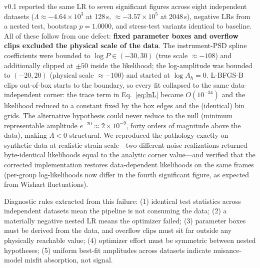 \documentclass[11pt]{article}
\newcommand{\Ah}{A_h}
\begin{document}
v0.1 reported the same LR to seven significant figures across eight independent datasets ($\Lambda \approx -4.64\times10^3$ at 128\,s, $\approx -3.57\times10^5$ at 2048\,s), negative LRs from a nested test, bootstrap $p = 1.0000$, and stress-test variants identical to baseline. All of these follow from one defect: \textbf{fixed parameter boxes and overflow clips excluded the physical scale of the data}. The instrument-PSD spline coefficients were bounded to $\log P \in (-30, 30)$ (true scale $\approx -108$) and additionally clipped at $\pm 50$ inside the likelihood; the log-amplitude was bounded to $(-20, 20)$ (physical scale $\approx -100$) and started at $\log \Ah = 0$. L-BFGS-B clips out-of-box starts to the boundary, so every fit collapsed to the same data-independent corner: the trace term in Eq.~\eqref{eq:lnL} became $O(10^{-34})$ and the likelihood reduced to a constant fixed by the box edges and the (identical) bin grids. The alternative hypothesis could never reduce to the null (minimum representable amplitude $e^{-20} \approx 2\times10^{-9}$, forty orders of magnitude above the data), making $\Lambda < 0$ structural. We reproduced the pathology exactly on synthetic data at realistic strain scale---two different noise realizations returned byte-identical likelihoods equal to the analytic corner value---and verified that the corrected implementation restores data-dependent likelihoods on the same frames (per-group log-likelihoods now differ in the fourth significant figure, as expected from Wishart fluctuations).

Diagnostic rules extracted from this failure: (1) identical test statistics across independent datasets mean the pipeline is not consuming the data; (2) a materially negative nested LR means the optimizer failed; (3) parameter boxes must be derived from the data, and overflow clips must sit far outside any physically reachable value; (4) optimizer effort must be symmetric between nested hypotheses; (5) uniform best-fit amplitudes across datasets indicate nuisance-model misfit absorption, not signal.
\end{document}
